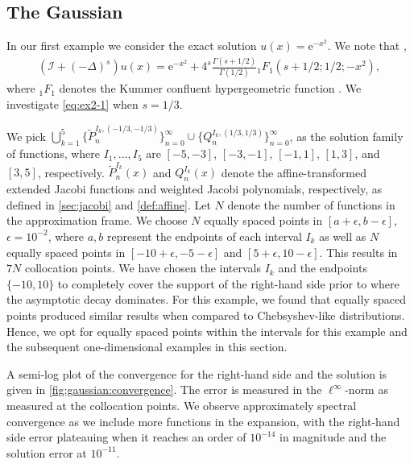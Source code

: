 \documentclass[10pt,a4paper]{article}
\newcommand{\eP}{\tilde{P}}
\newcommand{\E}{\mathrm{e}}
\numberwithin{equation}{section}
\begin{document}
\subsection{The Gaussian}
\label{sec:gaussian}
In our first example we consider the exact solution $u(x) =  \E^{-x^2}$. We note that \cite[Prop.~4.2]{Sheng2020},
\begin{align}
(\mathcal{I} + (-\Delta)^{s}) u(x)  =  \E^{-x^2} + 4^s \frac{\Gamma(s+1/2)}{\Gamma(1/2)} {_1}F_1(s+1/2;1/2;-x^2), \label{eq:ex2-1}
\end{align}
where ${_1}F_1$ denotes the Kummer confluent hypergeometric function \cite[Sec.~16.2]{OlverNIST}. We investigate \cref{eq:ex2-1} when $s=1/3$.

We pick $\bigcup_{k=1}^5 \{ \eP_n^{I_k,(-1/3,-1/3)} \}_{n=0}^\infty \cup \{ Q_n^{I_k, (1/3,1/3)} \}_{n=0}^\infty$, as the solution family of functions, where $I_1,\dots,I_5$ are $[-5,-3]$, $[-3,-1]$, $[-1,1]$, $[1,3]$, and $[3,5]$, respectively. $\eP^{I_k}_n(x)$ and $Q^{I_k}_n(x)$ denote the affine-transformed extended Jacobi functions and weighted Jacobi polynomials, respectively, as defined in \cref{sec:jacobi} and \cref{def:affine}. Let $N$ denote the number of functions in the approximation frame. We choose $N$ equally spaced points in $[a+\epsilon, b-\epsilon]$, $\epsilon = 10^{-2}$, where $a, b$ represent the endpoints of each interval $I_k$ as well as $N$ equally spaced points in $[-10+\epsilon,-5-\epsilon]$ and $[5+\epsilon,10-\epsilon]$. This results in $7N$ collocation points.  We have chosen the intervals $I_k$ and the endpoints $\{-10,10\}$ to completely cover the support of the right-hand side prior to where the asymptotic decay dominates. For this example, we found that equally spaced points produced similar results when compared to Chebsyshev-like distributions. Hence, we opt for equally spaced points within the intervals for this example and the subsequent one-dimensional examples in this section. 

A semi-log plot of the convergence for the right-hand side and the solution is given in \cref{fig:gaussian:convergence}. The error is measured in the $\ell^\infty$-norm as measured at the collocation points. We observe approximately spectral convergence as we include more functions in the expansion, with the right-hand side error  plateauing when it reaches an order of $10^{-14}$ in magnitude and the solution error at $10^{-11}$. 
\end{document}
